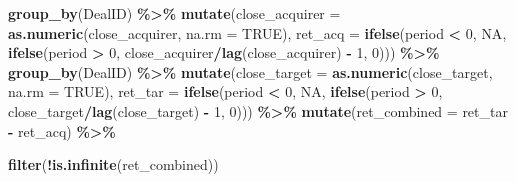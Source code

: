 \documentclass[
]{article}
\newenvironment{Shaded}{\begin{snugshade}}{\end{snugshade}}
\newcommand{\DataTypeTok}[1]{\textcolor[rgb]{0.13,0.29,0.53}{#1}}
\newcommand{\DecValTok}[1]{\textcolor[rgb]{0.00,0.00,0.81}{#1}}
\newcommand{\KeywordTok}[1]{\textcolor[rgb]{0.13,0.29,0.53}{\textbf{#1}}}
\newcommand{\NormalTok}[1]{#1}
\newcommand{\OperatorTok}[1]{\textcolor[rgb]{0.81,0.36,0.00}{\textbf{#1}}}
\newcommand{\OtherTok}[1]{\textcolor[rgb]{0.56,0.35,0.01}{#1}}
\newcommand{\StringTok}[1]{\textcolor[rgb]{0.31,0.60,0.02}{#1}}
\begin{document}
\begin{Shaded}
\begin{Highlighting}[]
\StringTok{  }\KeywordTok{group\_by}\NormalTok{(DealID) }\OperatorTok{\%\textgreater{}\%}
\StringTok{  }\KeywordTok{mutate}\NormalTok{(}\DataTypeTok{close\_acquirer =} \KeywordTok{as.numeric}\NormalTok{(close\_acquirer, }\DataTypeTok{na.rm =} \OtherTok{TRUE}\NormalTok{),}
    \DataTypeTok{ret\_acq =} \KeywordTok{ifelse}\NormalTok{(period }\OperatorTok{\textless{}}\StringTok{ }\DecValTok{0}\NormalTok{, }\OtherTok{NA}\NormalTok{, }\KeywordTok{ifelse}\NormalTok{(period }\OperatorTok{\textgreater{}}\StringTok{ }\DecValTok{0}\NormalTok{, close\_acquirer}\OperatorTok{/}\KeywordTok{lag}\NormalTok{(close\_acquirer) }\OperatorTok{{-}}\StringTok{ }\DecValTok{1}\NormalTok{, }\DecValTok{0}\NormalTok{))) }\OperatorTok{\%\textgreater{}\%}
\StringTok{  }
\StringTok{  }\KeywordTok{group\_by}\NormalTok{(DealID) }\OperatorTok{\%\textgreater{}\%}
\StringTok{  }\KeywordTok{mutate}\NormalTok{(}\DataTypeTok{close\_target =} \KeywordTok{as.numeric}\NormalTok{(close\_target, }\DataTypeTok{na.rm =} \OtherTok{TRUE}\NormalTok{),}
    \DataTypeTok{ret\_tar =} \KeywordTok{ifelse}\NormalTok{(period }\OperatorTok{\textless{}}\StringTok{ }\DecValTok{0}\NormalTok{, }\OtherTok{NA}\NormalTok{, }\KeywordTok{ifelse}\NormalTok{(period }\OperatorTok{\textgreater{}}\StringTok{ }\DecValTok{0}\NormalTok{, close\_target}\OperatorTok{/}\KeywordTok{lag}\NormalTok{(close\_target) }\OperatorTok{{-}}\StringTok{ }\DecValTok{1}\NormalTok{, }\DecValTok{0}\NormalTok{))) }\OperatorTok{\%\textgreater{}\%}
\StringTok{  }
\StringTok{  }
\StringTok{  }\KeywordTok{mutate}\NormalTok{(}\DataTypeTok{ret\_combined =}\NormalTok{  ret\_tar }\OperatorTok{{-}}\StringTok{ }\NormalTok{ret\_acq) }\OperatorTok{\%\textgreater{}\%}\StringTok{ }

\StringTok{  }\KeywordTok{filter}\NormalTok{(}\OperatorTok{!}\KeywordTok{is.infinite}\NormalTok{(ret\_combined))}



\end{Highlighting}
\end{Shaded}
\end{document}
